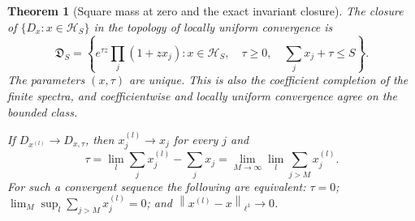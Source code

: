 \documentclass[11pt,a4paper]{amsart}
\numberwithin{equation}{section}
\newtheorem{theorem}{Theorem}[section]
\theoremstyle{definition}
\theoremstyle{remark}
\newcommand{\norm}[1]{\left\lVert#1\right\rVert}
\begin{document}
\begin{theorem}[Square mass at zero and the exact invariant closure]\label{thm:pfaffian_mass_defect}
The closure of $\{D_x:x\in\mathcal H_S\}$ in the topology of locally uniform convergence is
\begin{equation}\label{eq:pfaffian_defect_class}
 \mathfrak D_S=\left\{e^{\tau z}\prod_j(1+zx_j):
      x\in\mathcal H_S,\quad\tau\ge0,\quad\sum_jx_j+\tau\le S\right\}.
\end{equation}
The parameters $(x,\tau)$ are unique. This is also the coefficient completion of the finite spectra, and coefficientwise and locally uniform convergence agree on the bounded class.

If $D_{x^{(l)}}\to D_{x,\tau}$, then $x_j^{(l)}\to x_j$ for every $j$ and
\begin{equation}\label{eq:pfaffian_zero_mass_formula}
 \tau=\lim_l\sum_jx_j^{(l)}-\sum_jx_j
      =\lim_{M\to\infty}\lim_l\sum_{j>M}x_j^{(l)}.
\end{equation}
For such a convergent sequence the following are equivalent:
$\tau=0$; $\lim_M\sup_l\sum_{j>M}x_j^{(l)}=0$; and
$\norm{x^{(l)}-x}_{\ell^1}\to0$.
\end{theorem}
\end{document}
